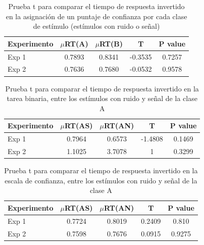 \begin{table}
\caption[Prueba t para comparar el tiempo de respuesta invertido en la Escala de Confianza por cada clase de estímulo (estímulos con ruido o señal)]{Prueba t para comparar el tiempo de respuesta invertido en la asignación de un puntaje de confianza por cada clase de estímulo (estímulos con ruido o señal)}
\label{Tabla_RT2_AB}
\centering
\begin{tabular}{l |  c c c c}
\toprule
\textbf{Experimento} & \textbf{$\mu$RT(A)} & \textbf{$\mu$RT(B)} & \textbf{T} & \textbf{P value}\\
\midrule
Exp 1 & 0.7893 & 0.8341 & -0.3535 & 0.7257 \\
Exp 2 & 0.7636 & 0.7680 & -0.0532 & 0.9578 \\
\bottomrule
\end{tabular}
\end{table}

\begin{table}
\caption[Prueba t para comparar el tiempo de respuesta invertido en la tarea binaria, entre los estímulos con ruido y señal de la clase A]{Prueba t para comparar el tiempo de respuesta invertido en la tarea binaria, entre los estímulos con ruido y señal de la clase A}
\label{Tabla_RT1_A}
\centering
\begin{tabular}{l |  c c c c}
\toprule
\textbf{Experimento} & \textbf{$\mu$RT(AS)} & \textbf{$\mu$RT(AN)} & \textbf{T} & \textbf{P value}\\
\midrule
Exp 1 & 0.7964 & 0.6573 & -1.4808 & 0.1469 \\
Exp 2 & 1.1025 & 3.7078 & 1 & 0.3299 \\
\bottomrule
\end{tabular}
\end{table}

\begin{table}
\caption[Prueba t para comparar el tiempo de respuesta invertido en la escala de confianza, entre los estímulos con ruido y señal de la clase A]{Prueba t para comparar el tiempo de respuesta invertido en la escala de confianza, entre los estímulos con ruido y señal de la clase A}
\label{Tabla_RT2_A}
\centering
\begin{tabular}{l | c c c c}
\toprule
\textbf{Experimento} & \textbf{$\mu$RT(AS)} & \textbf{$\mu$RT(AN)} & \textbf{T} & \textbf{P value}\\
\midrule
Exp 1 & 0.7724 & 0.8019 & 0.2409 & 0.810 \\
Exp 2 & 0.7598 & 0.7676 & 0.0915 & 0.9275  \\
\bottomrule
\end{tabular}
\end{table}


